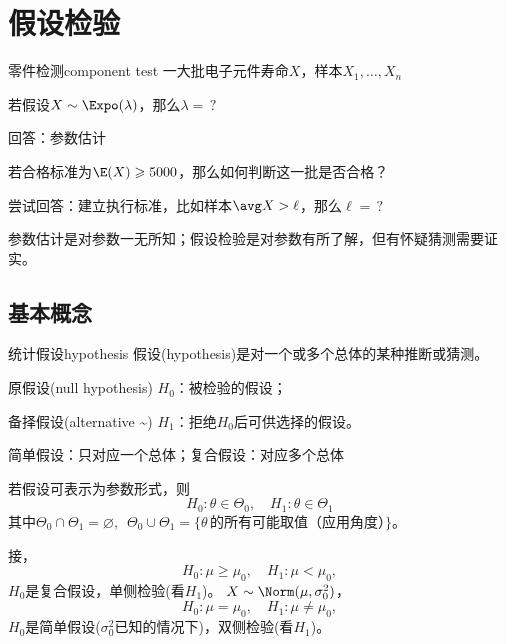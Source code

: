 \chapter{假设检验}
\begin{example}{零件检测}{component test}
	一大批电子元件寿命$X$，样本$X_1,\ldots,X_n$
	\begin{compactenum}
		\item 若假设$X\sim\Expo(\lambda)$，那么$\lambda=\,?$

		回答：参数估计
		\item 若合格标准为$\E(X)\geqslant 5000$，那么如何判断这一批是否合格？
		
		尝试回答：建立执行标准，比如样本$\avg X>\ell$，那么$\ell=\,?$

	\end{compactenum}
\end{example}
参数估计是对参数一无所知；假设检验是对参数有所了解，但有怀疑猜测需要证实。
\section{基本概念}
\begin{definition}{统计假设}{hypothesis}
	假设(hypothesis)是对一个或多个总体的某种推断或猜测。
	\begin{compactitem}
		\item 原假设(null hypothesis) $H_0$：被检验的假设；
		\item 备择假设(alternative \textasciitilde) $H_1$：拒绝$H_0$后可供选择的假设。
	\end{compactitem}
	简单假设：只对应一个总体；复合假设：对应多个总体
\end{definition}
若假设可表示为参数形式，则
\[
	H_0:\theta\in\varTheta_0,\quad H_1:\theta\in\varTheta_1
\]
其中$\varTheta_0\cap\varTheta_1=\varnothing,\enspace\varTheta_0\cup\varTheta_1=\{\theta\,\text{的所有可能取值（应用角度）\}}$。
\begin{example}{}{}
	接，
	\[
		H_0:\mu\geqslant\mu_0,\quad H_1:\mu<\mu_0,
	\]
	$H_0$是复合假设，单侧检验(看$H_1$)。
	\tcblower
	$X\sim\Norm(\mu,\sigma_0^2)$，
	\[
		H_0:\mu=\mu_0,\quad H_1:\mu\neq\mu_0,
	\]
	$H_0$是简单假设($\sigma_0^2$已知的情况下)，双侧检验(看$H_1$)。
\end{example}

